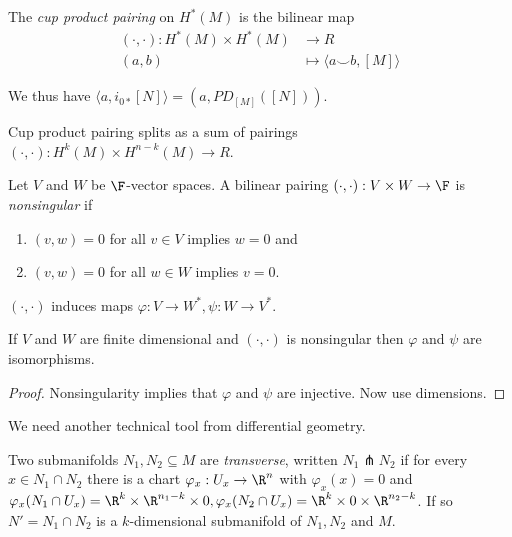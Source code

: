 \documentclass[a4paper]{article}
\newcommand*{\cp}{\smile} %
\begin{document}
\begin{definition}
  The \emph{cup product pairing} on \(H^*(M)\) is the bilinear map
  \begin{align*}
    (\cdot, \cdot): H^*(M) \times H^*(M) &\to R \\
    (a, b) &\mapsto \langle a \cp b, [M] \rangle
  \end{align*}
\end{definition}
We thus have \(\langle a, i_{0*}[N] \rangle = (a, PD_{[M]}([N]))\).

\begin{remark}
  Cup product pairing splits as a sum of pairings \((\cdot, \cdot): H^k(M) \times H^{n - k}(M) \to R\).
\end{remark}

\begin{definition}
  Let \(V\) and \(W\) be \(\F\)-vector spaces. A bilinear pairing \((\cdot, \cdot): V \times W \to \F\) is \emph{nonsingular} if
  \begin{enumerate}
  \item \((v, w) = 0\) for all \(v \in V\) implies \(w = 0\) and
  \item \((v, w) = 0\) for all \(w \in W\) implies \(v = 0\). 
  \end{enumerate}

  \((\cdot, \cdot)\) induces maps \(\varphi: V \to W^*, \psi: W \to V^*\).
\end{definition}

\begin{lemma}
  If \(V\) and \(W\) are finite dimensional and \((\cdot, \cdot)\) is nonsingular then \(\varphi\) and \(\psi\) are isomorphisms.
\end{lemma}

\begin{proof}
  Nonsingularity implies that \(\varphi\) and \(\psi\) are injective. Now use dimensions.
\end{proof}

We need another technical tool from differential geometry.

\begin{definition}[transverse]
  Two submanifolds \(N_1, N_2 \subseteq M\) are \emph{transverse}, written \(N_1 \pitchfork N_2\) if for every \(x \in N_1 \cap N_2\) there is a chart \(\varphi_x: U_x \to \R^n\) with \(\varphi_x(x) = 0\) and \(\varphi_x(N_1 \cap U_x) = \R^k \times \R^{n_1 - k} \times 0, \varphi_x(N_2 \cap U_x) = \R^k \times 0 \times \R^{n_2 - k}\). If so \(N' = N_1 \cap N_2\) is a \(k\)-dimensional submanifold of \(N_1, N_2\) and \(M\).
\end{definition}
\end{document}
